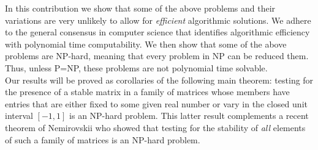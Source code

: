 In this contribution we show that some of the above problems and their
variations are very unlikely to allow for
{\it efficient} algorithmic solutions.
We adhere to the general consensus in computer science that identifies 
algorithmic efficiency with polynomial time computability.
We then show that some of the above problems are NP-hard,
meaning that every problem in NP can be reduced them.
Thus, 
unless P=NP,
these problems are not polynomial time solvable.\\

Our results will be proved as corollaries of the following main theorem: 
testing for the presence of a stable matrix in a family
of matrices whose members  have entries that 
are either fixed to some given real number 
or vary in the closed unit interval $[-1, 1]$ is an NP-hard problem.
This latter result complements a
recent theorem of Nemirovskii
who showed that testing for 
the stability of {\it all} elements of such a family
of matrices is an NP-hard problem.

